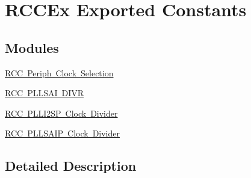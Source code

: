 \hypertarget{group___r_c_c_ex___exported___constants}{}\section{R\+C\+C\+Ex Exported Constants}
\label{group___r_c_c_ex___exported___constants}
\subsection*{Modules}
\begin{DoxyCompactItemize}
\item 
\mbox{\hyperlink{group___r_c_c_ex___periph___clock___selection}{R\+C\+C Periph Clock Selection}}
\item 
\mbox{\hyperlink{group___r_c_c_ex___p_l_l_s_a_i___d_i_v_r}{R\+C\+C P\+L\+L\+S\+A\+I D\+I\+VR}}
\item 
\mbox{\hyperlink{group___r_c_c_ex___p_l_l_i2_s_p___clock___divider}{R\+C\+C P\+L\+L\+I2\+S\+P Clock Divider}}
\item 
\mbox{\hyperlink{group___r_c_c_ex___p_l_l_s_a_i_p___clock___divider}{R\+C\+C P\+L\+L\+S\+A\+I\+P Clock Divider}}
\end{DoxyCompactItemize}


\subsection{Detailed Description}
